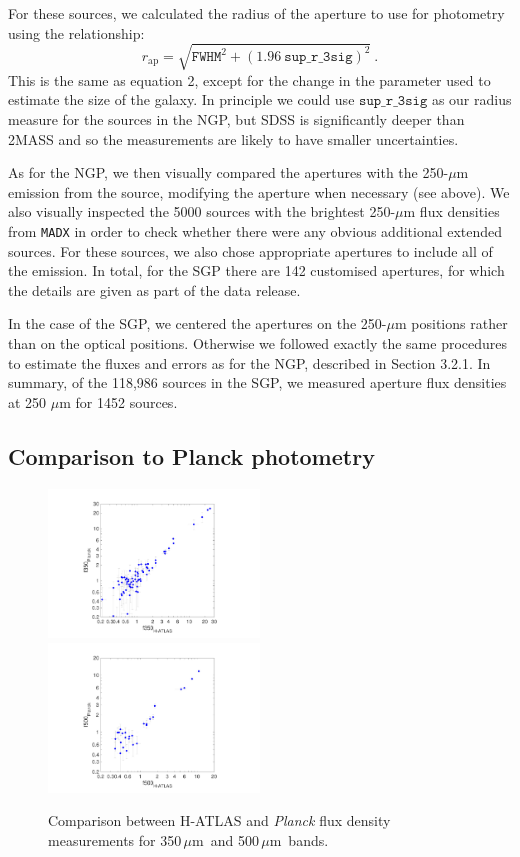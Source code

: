 \documentclass[a4paper,fleqn,usenatbib, twocolumn]{aastex61}
\def\mic{\,$\mu $m}
\begin{document}
For these sources, we calculated the radius of the aperture
to use for photometry using the relationship:
\smallskip
\begin{equation} 
r_\mathrm{ap} = \sqrt{ \mathtt{FWHM}^2 + {(1.96
    \ \mathtt{sup\_r\_3sig})}^2}\ .
\end{equation}
This is the same as equation 2, except for the change
in the parameter used to estimate the size of the galaxy.
In principle we could use $\mathtt{sup\_r\_3sig}$ as our radius
measure for  the sources in the NGP, but SDSS is significantly deeper than 2MASS
and so the measurements are likely to have smaller uncertainties. 

As for the NGP, we then visually compared the apertures with the
250-$\mu$m emission from the source, modifying the aperture when
necessary (see above).  We also visually inspected the 5000 sources
with the brightest 250-$\mu$m flux densities from {\tt MADX} in order to
check whether there were any obvious additional extended sources.  For
these sources, we also chose appropriate apertures to include all of
the emission.  In total, for the SGP there are 142 customised
apertures, for which the details are given as part of the data
release.

In the case of the SGP, we centered the apertures on the 250-$\mu$m
positions rather than on the optical positions. Otherwise we followed
exactly the same procedures to estimate the fluxes and errors as for
the NGP, described in Section 3.2.1.  In summary, of the 118,986
sources in the SGP, we measured aperture flux densities at 250 $\mu$m
for 1452 sources.

\subsection{ Comparison to Planck photometry}

\begin{figure}
  \includegraphics[width=0.5\textwidth, trim=40mm .0mm 40.0mm .0mm, clip=True]{planck_comp350.pdf}
  \includegraphics[width=0.5\textwidth, trim=40mm .0mm 40.0mm .0mm, clip=True]{planck_comp500.pdf}
  \caption{Comparison between H-ATLAS and {\it Planck} flux density measurements for
    350\mic\ and 500\mic\ bands.}\label{fig:planck}
\end{figure}
\end{document}
